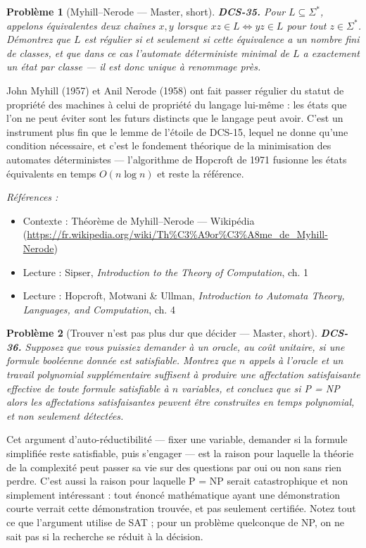 \documentclass[11pt]{article}
\newtheorem{problem}{Problème}
\newenvironment{refs}{\par\small\noindent\emph{Références :}\begin{itemize}\setlength\itemsep{0pt}}{\end{itemize}\normalsize}
\begin{document}
\bigskip

\begin{problem}[{Myhill--Nerode --- Master, short}]
\textbf{DCS-35.} Pour $L \subseteq \Sigma^*$, appelons équivalentes deux chaînes $x, y$ lorsque $xz \in L \iff yz \in L$ pour tout $z \in \Sigma^*$. Démontrez que $L$ est régulier si et seulement si cette équivalence a un nombre fini de classes, et que dans ce cas l'automate déterministe minimal de $L$ a exactement un état par classe --- il est donc unique à renommage près.
\end{problem}

\noindent John Myhill (1957) et Anil Nerode (1958) ont fait passer \og{} régulier \fg{} du statut de propriété des machines à celui de propriété du langage lui-même : les états que l'on ne peut éviter sont les futurs distincts que le langage peut avoir. C'est un instrument plus fin que le lemme de l'étoile de DCS-15, lequel ne donne qu'une condition nécessaire, et c'est le fondement théorique de la minimisation des automates déterministes --- l'algorithme de Hopcroft de 1971 fusionne les états équivalents en temps $O(n \log n)$ et reste la référence.

\begin{refs}
\item Contexte : Théorème de Myhill--Nerode --- Wikipédia (\url{https://fr.wikipedia.org/wiki/Th%C3%A9or%C3%A8me_de_Myhill-Nerode})
\item Lecture : Sipser, \textit{Introduction to the Theory of Computation}, ch. 1
\item Lecture : Hopcroft, Motwani \& Ullman, \textit{Introduction to Automata Theory, Languages, and Computation}, ch. 4
\end{refs}

\bigskip

\begin{problem}[{Trouver n'est pas plus dur que décider --- Master, short}]
\textbf{DCS-36.} Supposez que vous puissiez demander à un oracle, au coût unitaire, si une formule booléenne donnée est satisfiable. Montrez que $n$ appels à l'oracle et un travail polynomial supplémentaire suffisent à produire une affectation satisfaisante effective de toute formule satisfiable à $n$ variables, et concluez que si P = NP alors les affectations satisfaisantes peuvent être \textit{construites} en temps polynomial, et non seulement détectées.
\end{problem}

\noindent Cet argument d'auto-réductibilité --- fixer une variable, demander si la formule simplifiée reste satisfiable, puis s'engager --- est la raison pour laquelle la théorie de la complexité peut passer sa vie sur des questions par oui ou non sans rien perdre. C'est aussi la raison pour laquelle \og{} P = NP \fg{} serait catastrophique et non simplement intéressant : tout énoncé mathématique ayant une démonstration courte verrait cette démonstration trouvée, et pas seulement certifiée. Notez tout ce que l'argument utilise de SAT ; pour un problème quelconque de NP, on ne sait pas si la recherche se réduit à la décision.
\end{document}
